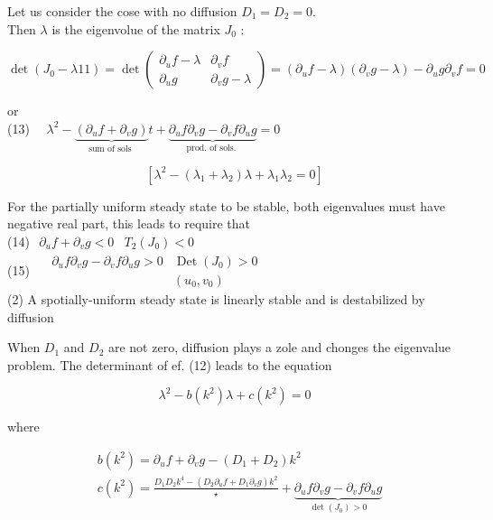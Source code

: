 \documentclass[10pt]{article}
\begin{document}
Let us consider the cose with no diffusion $D_{1}=D_{2}=0$.\\
Then $\lambda$ is the eigenvolue of the matrix $J_{0}$ :

$$
\operatorname{det}\left(J_{0}-\lambda 11\right)=\operatorname{det}\left(\begin{array}{cc}
\partial_{u} f-\lambda & \partial_{v} f \\
\partial_{u} g & \partial_{v} g-\lambda
\end{array}\right)=\left(\partial_{u} f-\lambda\right)\left(\partial_{v} g-\lambda\right)-\partial_{u} g \partial_{v} f=0
$$

or\\
(13) $\quad \lambda^{2}-\underbrace{\left(\partial_{u} f+\partial_{v} g\right)}_{\text {sum of sols }} t+\underbrace{\partial_{u} f \partial_{v} g-\partial_{v} f \partial_{u} g}_{\text {prod. of sols. }}=0$

$$
\left[\lambda^{2}-\left(\lambda_{1}+\lambda_{2}\right) \lambda+\lambda_{1} \lambda_{2}=0\right]
$$

For the partially uniform steady state to be stable, both eigenvalues must have negative real part, this leads to require that\\
(14) $\begin{array}{ll}\partial_{u} f+\partial_{v} g<0 & T_{2}\left(J_{0}\right)<0\end{array}$\\
(15) $\quad \begin{array}{ll}\partial_{u} f \partial_{v} g-\partial_{v} f \partial_{u} g>0 & \operatorname{Det}\left(J_{0}\right)>0 \\ & \left(u_{0}, v_{0}\right)\end{array}$\\
(2) A spotially-uniform steady state is linearly stable and is destabilized by diffusion

When $D_{1}$ and $D_{2}$ are not zero, diffusion plays a zole and chonges the eigenvalue problem. The determinant of ef. (12) leads to the equation


\begin{equation*}
\lambda^{2}-b\left(k^{2}\right) \lambda+c\left(k^{2}\right)=0 \tag{16}
\end{equation*}


where


\begin{align*}
& b\left(k^{2}\right)=\partial_{u} f+\partial_{v} g-\left(D_{1}+D_{2}\right) k^{2}  \tag{17}\\
& c\left(k^{2}\right)=\frac{D_{1} D_{2} k^{4}-\left(D_{2} \partial_{u} f+D_{1} \partial_{v} g\right) k^{2}}{\star}+\underbrace{\partial_{u} f \partial_{v} g-\partial_{v} f \partial_{u} g}_{\operatorname{det}\left(J_{0}\right)>0}
\end{align*}
\end{document}
